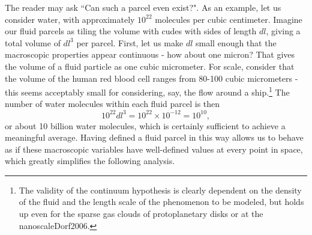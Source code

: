 The reader may ask ``Can such a  parcel even exist?". As an example, let us consider water, with approximately $10^{22}$ molecules per cubic centimeter. Imagine our fluid parcels as tiling the volume with cudes with sides of length $dl$, giving a total volume of $dl^3$ per parcel. First, let us make $dl$ small enough that the macroscopic properties appear continuous - how about one micron? That gives the volume of a fluid particle as one cubic micrometer. For scale, consider that the volume of the human red blood cell ranges from 80-100 cubic micrometers - this seems acceptably small for considering, say, the flow around a ship.\footnote{The validity of the continuum hypothesis is clearly dependent on the density of the fluid and the length scale of the phenomenon to be modeled, but holds up even for the sparse gas clouds of protoplanetary disks or at the nanoscale{Dorf2006}.} The number of water molecules within each fluid parcel is then 
\begin{equation}
10^{22}dl^3 = 10^{22} \times 10^{-12} = 10^{10},
\end{equation}   
or about 10 billion water molecules, which is certainly sufficient to achieve a meaningful average. Having defined a fluid parcel in this way allows us to behave as if these macroscopic variables have well-defined values at every point in space, which greatly simplifies the following analysis. 

